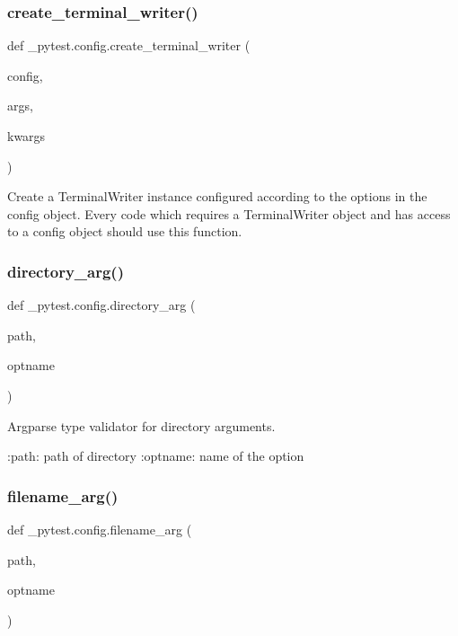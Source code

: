 \subsubsection{\texorpdfstring{create\+\_\+terminal\+\_\+writer()}{create\_terminal\_writer()}}
{\footnotesize\ttfamily def \+\_\+pytest.\+config.\+create\+\_\+terminal\+\_\+writer (\begin{DoxyParamCaption}\item[{}]{config,  }\item[{}]{args,  }\item[{}]{kwargs }\end{DoxyParamCaption})}

\begin{DoxyVerb}Create a TerminalWriter instance configured according to the options
in the config object. Every code which requires a TerminalWriter object
and has access to a config object should use this function.
\end{DoxyVerb}
 \mbox{\label{namespace__pytest_1_1config_a2d031894eb39f6335bed2f49405b0aff}} 
\subsubsection{\texorpdfstring{directory\+\_\+arg()}{directory\_arg()}}
{\footnotesize\ttfamily def \+\_\+pytest.\+config.\+directory\+\_\+arg (\begin{DoxyParamCaption}\item[{}]{path,  }\item[{}]{optname }\end{DoxyParamCaption})}

\begin{DoxyVerb}Argparse type validator for directory arguments.

:path: path of directory
:optname: name of the option
\end{DoxyVerb}
 \mbox{\label{namespace__pytest_1_1config_a5b6a91e7986a9a63f55f2bedcbf10c33}} 
\subsubsection{\texorpdfstring{filename\+\_\+arg()}{filename\_arg()}}
{\footnotesize\ttfamily def \+\_\+pytest.\+config.\+filename\+\_\+arg (\begin{DoxyParamCaption}\item[{}]{path,  }\item[{}]{optname }\end{DoxyParamCaption})}

